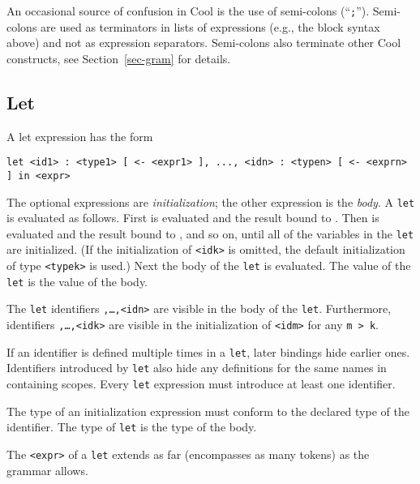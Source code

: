 \documentclass[11pt]{article}
\begin{document}
An occasional source of confusion in Cool is the use of semi-colons (``{\tt ;}'').
Semi-colons are used as terminators in lists of expressions
(e.g., the block syntax above) and not as expression separators.
Semi-colons also terminate other Cool constructs, see
Section~\ref{sec-gram} for details.

\subsection{Let}
A let expression has the form
\begin{verbatim}
let <id1> : <type1> [ <- <expr1> ], ..., <idn> : <typen> [ <- <exprn> ] in <expr>
\end{verbatim}

The optional expressions are {\em initialization}; the other
expression is the {\em body}.
A {\tt let} is evaluated as follows.
First {\tt <expr1>} is evaluated and the result bound to {\tt <id1>}.
Then {\tt <expr2>} is evaluated and the result bound to {\tt <id2>},
and so on, until all of the variables in the
{\tt let} are initialized.  (If the initialization of {\tt <idk>} is
omitted, the default initialization of type {\tt <typek>} is used.)
Next the body of the {\tt let} is evaluated.
The value of the {\tt let} is the value of the body.

The {\tt let} identifiers {\tt <id1>,\ldots,<idn>} are visible in the
body of the {\tt let}.  Furthermore, identifiers {\tt <id1>,\ldots,<idk>} are
visible in the initialization of {\tt <idm>} for any {\tt m > k}.

If an identifier is defined multiple times in a {\tt let}, later
bindings hide earlier ones.  Identifiers introduced by {\tt let} also
hide any definitions for the same names in containing scopes.
Every {\tt let} expression must introduce at least one identifier.

The type of an initialization expression must conform to
the declared type of the identifier.  The type of {\tt let} is the type
of the body.

The {\tt <expr>} of a {\tt let} extends as far (encompasses as many tokens)
as the grammar allows.
\end{document}

